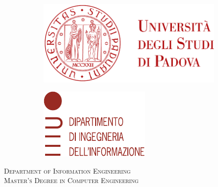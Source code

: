 \begin{titlepage}
	\begin{figure}
		\centering
		\begin{subfigure}[b]{0.4\textwidth}
			\includegraphics[width=\textwidth]{images/logo_unipd}
		\end{subfigure}
		\hfill
		\begin{subfigure}[b]{0.3\textwidth}
			\includegraphics[width=\textwidth]{images/logo_dei}
		\end{subfigure}
	\end{figure}


	\begin{center}
		\makeatletter %

		\textsc{Department of Information Engineering}\\
		\textsc{Master's Degree in Computer Engineering}


\end{center}
\end{titlepage}
